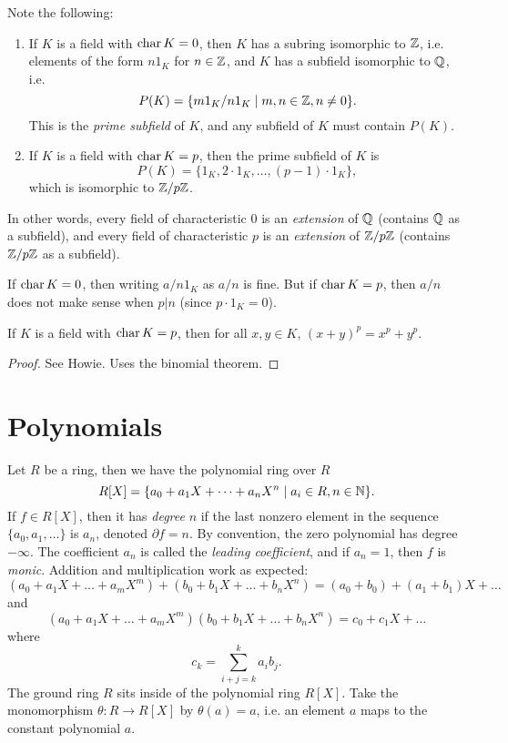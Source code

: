 \begin{remark}
  Note the following:
  \begin{enumerate}
    \item If $K$ is a field with $\operatorname{char} K = 0$, then
      $K$ has a subring isomorphic to $\mathbb{Z}$, i.e.
      elements of the form $n 1_K$ for $n \in \mathbb{Z}$,
      and $K$ has a subfield isomorphic to $\mathbb{Q}$,
      i.e.
      \[P(K) = \{m 1_K / n 1_K \mid m, n \in \mathbb{Z}, n \ne 0\}.\]
      This is the \emph{prime subfield} of $K$,
      and any subfield of $K$ must contain $P(K)$.
    \item If $K$ is a field with $\operatorname{char} K = p$, then
      the prime subfield of $K$ is
      \[P(K) = \{1_K, 2 \cdot 1_K, \dots, (p - 1) \cdot 1_K\},\]
      which is isomorphic to $\mathbb{Z} / p \mathbb{Z}$.
  \end{enumerate}
\end{remark}

\begin{remark}
  In other words, every field of characteristic $0$
  is an \emph{extension} of $\mathbb{Q}$ (contains $\mathbb{Q}$ as a subfield),
  and every field of characteristic $p$ is an
  \emph{extension} of $\mathbb{Z} / p \mathbb{Z}$ (contains $\mathbb{Z} / p\mathbb{Z}$
  as a subfield).
\end{remark}

\begin{remark}
  If $\operatorname{char} K = 0$, then writing $a / n 1_K$ as
  $a / n$ is fine. But if $\operatorname{char} K = p$, then
  $a / n$ does not make sense when $p | n$
  (since $p \cdot 1_K = 0$).
\end{remark}

\begin{theorem}
  \label{thm:freshman-exponentiation}
  If $K$ is a field with $\operatorname{char} K = p$, then
  for all $x, y \in K$, $(x + y)^p = x^p + y^p$.
\end{theorem}

\begin{proof}
  See Howie. Uses the binomial theorem.
\end{proof}

\section{Polynomials}
Let $R$ be a ring, then we have the polynomial ring
over $R$
\[
  R[X] = \{a_0 + a_1 X + \dots + a_n X^n \mid a_i \in R, n \in \mathbb{N}\}.
\]
If $f \in R[X]$, then it has \emph{degree} $n$ if the
last nonzero element in the sequence
$\{a_0, a_1, \dots\}$ is $a_n$, denoted
$\partial f = n$. By convention, the zero polynomial has
degree $-\infty$. The coefficient $a_n$ is called the
\emph{leading coefficient}, and if $a_n = 1$, then
$f$ is \emph{monic}. Addition and multiplication work
as expected:
\[
  (a_0 + a_1 X + \dots + a_m X^m) + (b_0 + b_1 X + \dots + b_n X^n)
  = (a_0 + b_0) + (a_1 + b_1) X + \dots
\]
and
\[
  (a_0 + a_1 X + \dots + a_m X^m)(b_0 + b_1 X + \dots + b_n X^n)
  = c_0 + c_1 X + \dots
\]
where
\[
  c_k = \sum_{i + j = k}^k a_i b_{j}.
\]
The ground ring $R$ sits inside of the polynomial ring
$R[X]$. Take the monomorphism $\theta : R \to R[X]$
by $\theta(a) = a$, i.e. an element $a$ maps to the
constant polynomial $a$.

